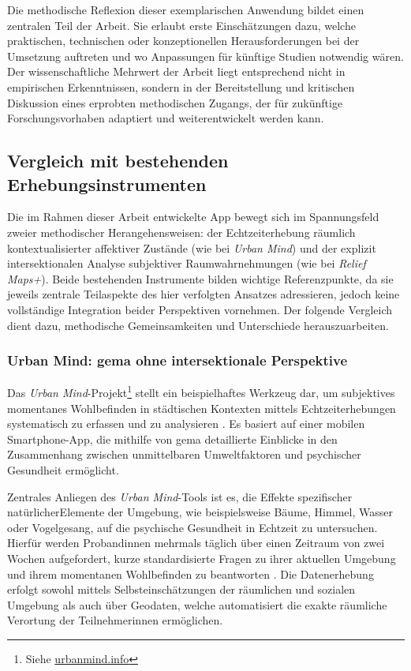 Die methodische Reflexion dieser exemplarischen Anwendung bildet einen zentralen Teil der Arbeit. Sie erlaubt erste Einschätzungen dazu, welche praktischen, technischen oder konzeptionellen Herausforderungen bei der Umsetzung auftreten und wo Anpassungen für künftige Studien notwendig wären. Der wissenschaftliche Mehrwert der Arbeit liegt entsprechend nicht in empirischen Erkenntnissen, sondern in der Bereitstellung und kritischen Diskussion eines erprobten methodischen Zugangs, der für zukünftige Forschungsvorhaben adaptiert und weiterentwickelt werden kann.


\subsection{Vergleich mit bestehenden Erhebungsinstrumenten}

Die im Rahmen dieser Arbeit entwickelte App bewegt sich im Spannungsfeld zweier methodischer Herangehensweisen: der Echtzeiterhebung räumlich kontextualisierter affektiver Zustände (wie bei \textit{Urban Mind}) und der explizit intersektionalen Analyse subjektiver Raumwahrnehmungen (wie bei \textit{Relief Maps+}). Beide bestehenden Instrumente bilden wichtige Referenzpunkte, da sie jeweils zentrale Teilaspekte des hier verfolgten Ansatzes adressieren, jedoch keine vollständige Integration beider Perspektiven vornehmen. Der folgende Vergleich dient dazu, methodische Gemeinsamkeiten und Unterschiede herauszuarbeiten.

\subsubsection{Urban Mind: \acrshort{gema} ohne intersektionale Perspektive}

Das \textit{Urban Mind}-Projekt\footnote{Siehe \href{https://www.urbanmind.info/}{urbanmind.info}} stellt ein beispielhaftes Werkzeug dar, um subjektives momentanes Wohlbefinden in städtischen Kontexten mittels Echtzeiterhebungen systematisch zu erfassen und zu analysieren \parencite{bakolisUrbanMindUsing2018}. Es basiert auf einer mobilen Smartphone-App, die mithilfe von \acrshort{gema} detaillierte Einblicke in den Zusammenhang zwischen unmittelbaren Umweltfaktoren und psychischer Gesundheit ermöglicht.

Zentrales Anliegen des \textit{Urban Mind}-Tools ist es, die Effekte spezifischer natürlicherElemente der Umgebung, wie beispielsweise Bäume, Himmel, Wasser oder Vogelgesang, auf die psychische Gesundheit in Echtzeit zu untersuchen. Hierfür werden Proband\genderstern innen mehrmals täglich über einen Zeitraum von zwei Wochen aufgefordert, kurze standardisierte Fragen zu ihrer aktuellen Umgebung und ihrem momentanen Wohlbefinden zu beantworten \parencite{bakolisUrbanMindUsing2018}. Die Datenerhebung erfolgt sowohl mittels Selbsteinschätzungen der räumlichen und sozialen Umgebung als auch über Geodaten, welche automatisiert die exakte räumliche Verortung der Teilnehmer\genderstern innen ermöglichen.

